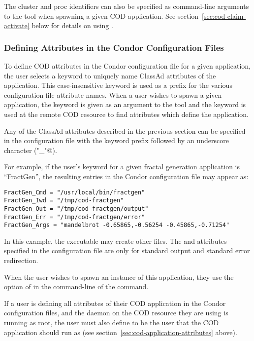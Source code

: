 \Note The cluster and proc identifiers can also be specified as
command-line arguments to the  tool when
spawning a given COD application.
See section~\ref{sec:cod-claim-activate} below for details on using
. 


\subsubsection{\label{sec:cod-config-attrs}
Defining Attributes in the Condor Configuration Files}


To define COD attributes in the Condor configuration file for a given
application, the user selects a keyword to uniquely name 
ClassAd attributes of the application.
This case-insensitive keyword is used as a prefix for the various
configuration file attribute names.
When a user wishes to spawn a given application, the
keyword is given as an argument to the  tool and the keyword
is used at the remote COD resource to find attributes which define the
application.

Any of the ClassAd attributes described in the previous section can be
specified in the configuration file with the keyword prefix followed
by an underscore character (\verb@"_"@).

For example, if the user's keyword for a given fractal generation
application is ``FractGen'', the resulting entries in the Condor
configuration file may appear as:

\begin{verbatim}
FractGen_Cmd = "/usr/local/bin/fractgen"
FractGen_Iwd = "/tmp/cod-fractgen"
FractGen_Out = "/tmp/cod-fractgen/output"
FractGen_Err = "/tmp/cod-fractgen/error"
FractGen_Args = "mandelbrot -0.65865,-0.56254 -0.45865,-0.71254"
\end{verbatim}

In this example, the executable may create other files.
The  and  attributes specified in the
configuration file are only for standard output and standard error
redirection.

When the user wishes to spawn an instance of this application,
they use the  option of  
in the command-line of the  command.

\Note If a user is defining all attributes of their COD application in
the Condor configuration files, and the  daemon on the COD
resource they are using is running as root, the user must also define
 to be the user that the COD application should run as
(see section~\ref{sec:cod-application-attributes} above). 


